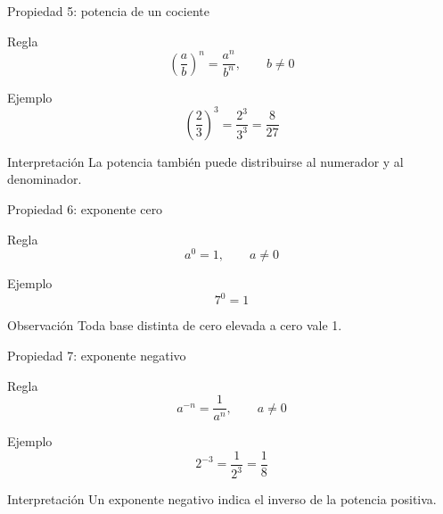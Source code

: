 \documentclass[aspectratio=169,10pt,handout]{beamer}
\begin{document}
	\begin{frame}{Propiedad 5: potencia de un cociente}
		\begin{block}{Regla}
			\[
			\left(\frac{a}{b}\right)^n = \frac{a^n}{b^n}, \qquad b\neq 0
			\]
		\end{block}
		
		\begin{exampleblock}{Ejemplo}
			\[
			\left(\frac{2}{3}\right)^3 = \frac{2^3}{3^3}=\frac{8}{27}
			\]
		\end{exampleblock}
		
		\begin{alertblock}{Interpretación}
			La potencia también puede distribuirse al numerador y al denominador.
		\end{alertblock}
	\end{frame}
	
	\begin{frame}{Propiedad 6: exponente cero}
		\begin{block}{Regla}
			\[
			a^0=1,\qquad a\neq0
			\]
		\end{block}
		
		\begin{exampleblock}{Ejemplo}
			\[
			7^0=1
			\]
		\end{exampleblock}
		
		\begin{alertblock}{Observación}
			Toda base distinta de cero elevada a cero vale 1.
		\end{alertblock}
	\end{frame}
	
	\begin{frame}{Propiedad 7: exponente negativo}
		\begin{block}{Regla}
			\[
			a^{-n}=\frac{1}{a^n},\qquad a\neq0
			\]
		\end{block}
		
		\begin{exampleblock}{Ejemplo}
			\[
			2^{-3}=\frac{1}{2^3}=\frac{1}{8}
			\]
		\end{exampleblock}
		
		\begin{alertblock}{Interpretación}
			Un exponente negativo indica el inverso de la potencia positiva.
		\end{alertblock}
	\end{frame}
	
\end{document}
